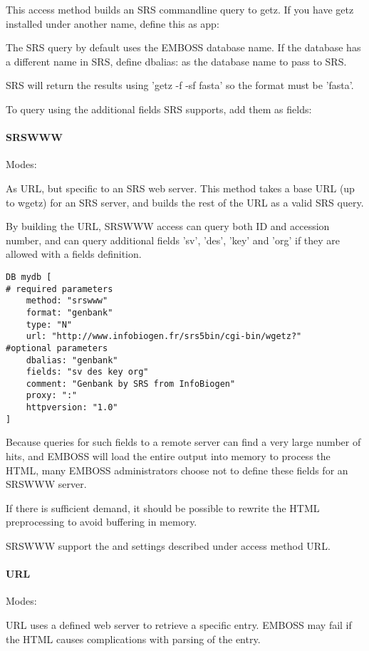 \documentclass{report}
\begin{document}
This access method builds an SRS commandline query to getz. If you
have getz installed under another name, define this as app:

The SRS query by default uses the EMBOSS database name. If the
database has a different name in SRS, define dbalias: as the database
name to pass to SRS.

SRS will return the results using 'getz -f -sf fasta' so the format
must be 'fasta'.

To query using the additional fields SRS supports, add them as fields:

\paragraph{SRSWWW}\par\noindent
Modes: \par\noindent
As URL, but specific to an SRS web server. This method takes a base
URL (up to wgetz) for an SRS server, and builds the rest of the URL as
a valid SRS query.

By building the URL, SRSWWW access can query both ID and accession
number, and can query additional fields 'sv', 'des', 'key' and 'org'
if they are allowed with a fields definition.

\begin{verbatim}
DB mydb [
# required parameters
    method: "srswww"
    format: "genbank"
    type: "N"
    url: "http://www.infobiogen.fr/srs5bin/cgi-bin/wgetz?"
#optional parameters
    dbalias: "genbank"
    fields: "sv des key org"
    comment: "Genbank by SRS from InfoBiogen"
    proxy: ":"
    httpversion: "1.0"
]
\end{verbatim}

Because queries for such fields to a remote server can find a very
large number of hits, and EMBOSS will load the entire output into
memory to process the HTML, many EMBOSS administrators choose not to
define these fields for an SRSWWW server.

If there is sufficient demand, it should be possible to rewrite the
HTML preprocessing to avoid buffering in memory.

SRSWWW support the  and  settings
described under access method URL.

\paragraph{URL}\par\noindent
Modes: \par\noindent URL uses a defined web server to
retrieve a specific entry. EMBOSS may fail if the HTML causes
complications with parsing of the entry.
\end{document}
